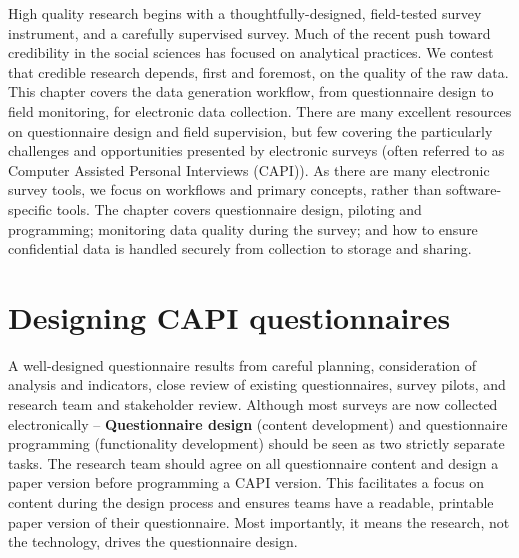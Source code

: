 
\begin{fullwidth}
High quality research begins with a thoughtfully-designed, field-tested survey instrument, and a carefully supervised survey. 
Much of the recent push toward credibility in the social sciences has focused on analytical practices. 
We contest that credible research depends, first and foremost, on the quality of the raw data. This chapter covers the data generation workflow, from questionnaire design to field monitoring, for electronic data collection. 
There are many excellent resources on questionnaire design and field supervision, 
but few covering the particularly challenges and opportunities presented by electronic surveys (often referred to as Computer Assisted Personal Interviews (CAPI)).
As there are many electronic survey tools, we focus on workflows and primary concepts, rather than software-specific tools. 
The chapter covers questionnaire design, piloting and programming; monitoring data quality during the survey; and how to ensure confidential data is handled securely from collection to storage and sharing. 
	

\end{fullwidth}


\section{Designing CAPI questionnaires}
A well-designed questionnaire results from careful planning, consideration of analysis and indicators, close review of existing questionnaires, survey pilots, and research team and stakeholder review. 
Although most surveys are now collected electronically  -- 
\textbf{Questionnaire design}
(content development) and questionnaire programming (functionality development) should be seen as two strictly separate tasks. 
The research team should agree on all questionnaire content and design a paper version before programming a CAPI version. 
This facilitates a focus on content during the design process and ensures teams have a readable, printable paper version of their questionnaire. 
Most importantly, it means the research, not the technology, drives the questionnaire design.  

